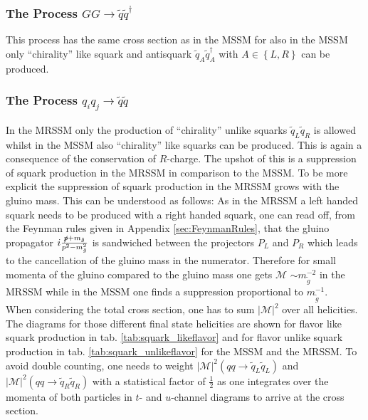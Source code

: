 \subsubsection*{The Process $GG \to \tilde{q}\tilde{q}^\dagger$}
This process has the same cross section as in the MSSM for also in the MSSM only ``chirality'' like squark and antisquark $\tilde{q}_A\tilde{q}_A^\dagger$ with $A \in \left\{L,R\right\}$ can be produced. 

\subsubsection*{The Process $q_i q_j \to \tilde{q}\tilde{q}$}
In the MRSSM only the production of ``chirality'' unlike squarks $\tilde{q}_L \tilde{q}_R$ is allowed whilst in the MSSM also ``chirality'' like squarks can be produced. This is again a consequence of the conservation of $R$-charge. The upshot of this is a suppression of squark production in the MRSSM in comparison to the MSSM. To be more explicit the suppression of squark production in the MRSSM grows with the gluino mass. This can be understood as follows: As in the MRSSM a left handed squark needs to be produced with a right handed squark, one can read off, from the Feynman rules given in Appendix \ref{sec:FeynmanRules}, that the gluino propagator $i\frac{\slashed{p}+m_{\tilde{g}}}{p^2-m_{\tilde{g}}^2}$ is sandwiched between the projectors $P_L$ and $P_R$ which leads to the cancellation of the gluino mass in the numerator. Therefore for small momenta of the gluino compared to the gluino mass one gets $\mathcal{M}$ $\sim m_{\tilde{g}}^{-2}$ in the MRSSM while in the MSSM one finds a suppression proportional to $m_{\tilde{g}}^{-1}$.\\
When considering the total cross section, one has to sum $|\mathcal{M}|^2$ over all helicities. The diagrams for those different final state helicities are shown for flavor like squark production in tab. \ref{tab:squark_likeflavor} and for flavor unlike squark production in tab. \ref{tab:squark_unlikeflavor} for the MSSM and the MRSSM. To avoid double counting, one needs to weight $|\mathcal{M}|^2(qq\to \tilde{q}_L\tilde{q}_L)$ and $|\mathcal{M}|^2(qq\to \tilde{q}_R\tilde{q}_R)$ with a statistical factor of $\frac{1}{2}$ as one integrates over the momenta of both particles in $t$- and $u$-channel diagrams to arrive at the cross section.

